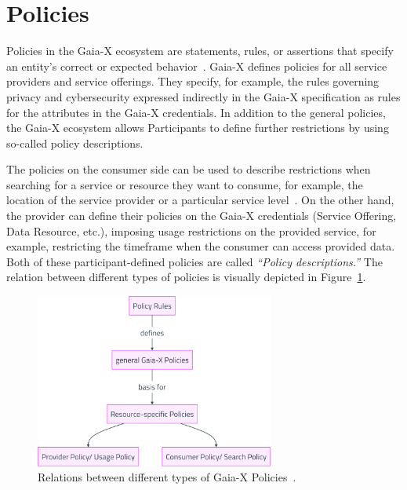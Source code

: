 \section{Policies}\label{sec:policies}

Policies in the Gaia-X ecosystem are statements, rules, or assertions that specify an entity's correct or expected behavior~\cite{gaiax_architecture_document}.
Gaia-X defines policies for all service providers and service offerings.
They specify, for example, the rules governing privacy and cybersecurity expressed indirectly in the Gaia-X specification as rules for the attributes in the Gaia-X credentials.
In addition to the general policies, the Gaia-X ecosystem allows Participants to define further restrictions by using so-called policy descriptions.

The policies on the consumer side can be used to describe restrictions when searching for a service or resource they want to consume, for example, the location of the service provider or a particular service level~\cite{gaiax_architecture_document}.
On the other hand, the provider can define their policies on the Gaia-X credentials (Service Offering, Data Resource, etc.), imposing usage restrictions on the provided service, for example, restricting the timeframe when the consumer can access provided data.
Both of these participant-defined policies are called \textit{``Policy descriptions.''}
The relation between different types of policies is visually depicted in Figure~\ref{fig:gaiax_policies}.

\begin{figure}
    \centering
    \includegraphics[width=0.7\textwidth]{figures/policies.png}
    \caption{Relations between different types of Gaia-X Policies~\cite{gaiax_architecture_document}.}\label{fig:gaiax_policies}
\end{figure}

